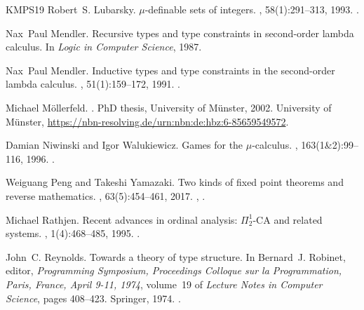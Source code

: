 \documentclass[10pt,a4paper]{amsart}
\theoremstyle{plain}
\theoremstyle{definition}
\theoremstyle{plain}
\theoremstyle{definition} %
\begin{document}
\begin{thebibliography}{KMPS19}
Robert~S. Lubarsky.
\newblock $\mu$-definable sets of integers.
, 58(1):291–313, 1993.
\newblock \href {https://doi.org/10.2307/2275338} {}.

Nax~Paul Mendler.
\newblock Recursive types and type constraints in second-order lambda calculus.
\newblock In {\em Logic in Computer Science}, 1987.

Nax~Paul Mendler.
\newblock Inductive types and type constraints in the second-order lambda calculus.
, 51(1):159--172, 1991.
\newblock \href {https://doi.org/10.1016/0168-0072(91)90069-X} {}.

Michael Möllerfeld.
.
\newblock PhD thesis, University of M\"{u}nster, 2002.
\newblock University of M\"unster, \url{https://nbn-resolving.de/urn:nbn:de:hbz:6-85659549572}.

Damian Niwinski and Igor Walukiewicz.
\newblock Games for the {\(\mu\)}-calculus.
, 163(1{\&}2):99--116, 1996.
\newblock \href {https://doi.org/10.1016/0304-3975(95)00136-0} {}.

Weiguang Peng and Takeshi Yamazaki.
\newblock Two kinds of fixed point theorems and reverse mathematics.
, 63(5):454--461, 2017.
\newblock \href {https://arxiv.org/abs/https://onlinelibrary.wiley.com/doi/pdf/10.1002/malq.201600096} {}, \href {https://doi.org/10.1002/malq.201600096} {}.

Michael Rathjen.
\newblock Recent advances in ordinal analysis: {$\Pi^1_2$-CA} and related systems.
, 1(4):468–485, 1995.
\newblock \href {https://doi.org/10.2307/421132} {}.

John~C. Reynolds.
\newblock Towards a theory of type structure.
\newblock In Bernard~J. Robinet, editor, {\em Programming Symposium, Proceedings Colloque sur la Programmation, Paris, France, April 9-11, 1974}, volume~19 of {\em Lecture Notes in Computer Science}, pages 408--423. Springer, 1974.
\newblock \href {https://doi.org/10.1007/3-540-06859-7\_148} {}.


\end{thebibliography}
\end{document}
